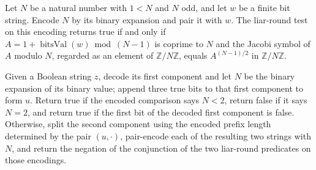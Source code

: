 \begin{theorem}
\label{Randomized.liarRound_pairEncode}
\leanok
{}
Let $N$ be a natural number with $1<N$ and $N$ odd, and let $w$ be a finite bit string.
Encode $N$ by its binary expansion and pair it with $w$. The liar-round test on this
encoding returns true if and only if $A=1+\operatorname{bitsVal}(w)\bmod(N-1)$ is
coprime to $N$ and the Jacobi symbol of $A$ modulo $N$, regarded as an element of
$\mathbb Z/N\mathbb Z$, equals $A^{(N-1)/2}$ in $\mathbb Z/N\mathbb Z$.
\end{theorem}

\begin{definition}
\label{Randomized.compositeTest}
\leanok
{}
Given a Boolean string $z$, decode its first component and let $N$ be the binary
expansion of its binary value; append three true bits to that first component to form
$u$. Return true if the encoded comparison says $N<2$, return false if it says $N=2$,
and return true if the first bit of the decoded first component is false. Otherwise,
split the second component using the encoded prefix length determined by the pair
$(u,\cdot)$, pair-encode each of the resulting two strings with $N$, and return the
negation of the conjunction of the two liar-round predicates on those encodings.
\end{definition}

